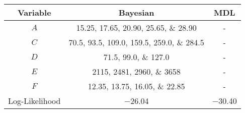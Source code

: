 \scriptsize
\begin{tabular}{@{}ccc@{}}
    \toprule
    Variable & Bayesian & MDL \\
    \midrule
    $A$ & \numlist[list-final-separator = {, }]{15.25; 17.65; 20.90; 25.65; 28.90} & - \\
    $C$ & \numlist[list-final-separator = {, }]{70.5; 93.5; 109.0; 159.5; 259.0; 284.5} & - \\
    $D$ & \numlist[list-final-separator = {, }]{71.5;99.0;127.0} & - \\
    $E$ & \numlist[list-final-separator = {, }]{2115;2481;2960;3658} & - \\
    $F$ & \numlist[list-final-separator = {, }]{12.35;13.75;16.05;22.85} & - \\
    \addlinespace[0.5em]
    Log-Likelihood & \num{-26.04} & \num{-30.40} \\
    \bottomrule
\end{tabular}